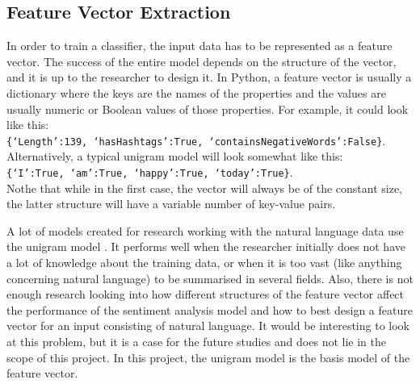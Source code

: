 \subsection{Feature Vector Extraction}
In order to train a classifier, the input data has to be represented as a feature vector. The success of the entire model depends on the structure of the vector, and it is up to the researcher to design it. In Python, a feature vector is usually a dictionary where the keys are the names of the properties and the values are usually numeric or Boolean values of those properties. For example, it could look like this: \\ \texttt{\{`Length':139, `hasHashtags':True, `containsNegativeWords':False\}}. \\Alternatively, a typical unigram model will look somewhat like this:\\ \texttt{\{`I':True, `am':True, `happy':True, `today':True\}}.\\Nothe that while in the first case, the vector will always be of the constant size, the latter structure will have a variable number of key-value pairs. 

 A lot of models created for research working with the natural language data use the unigram model \cite{agarwal2011sentiment}. It performs well when the researcher initially does not have a lot of knowledge about the training data, or when it is too vast (like anything concerning natural language) to be summarised in several fields. Also, there is not enough research looking into how different structures of the feature vector affect the performance of the sentiment analysis model and how to best design a feature vector for an input consisting of natural language. It would be interesting to look at this problem, but it is a case for the future studies and does not lie in the scope of this project. In this project, the unigram model is the basis model of the feature vector.  

